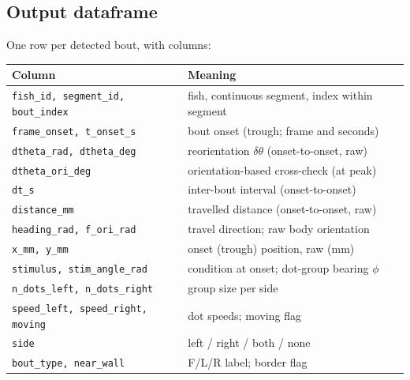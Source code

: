 \documentclass{article}
\begin{document}
\subsection{Output dataframe}
One row per detected bout, with columns:
\begin{table}[h]\centering\small
\begin{tabular}{@{}ll@{}}
\toprule
\textbf{Column} & \textbf{Meaning}\\
\midrule
\texttt{fish\_id, segment\_id, bout\_index} & fish, continuous segment, index within segment\\
\texttt{frame\_onset, t\_onset\_s}          & bout onset (trough; frame and seconds)\\
\texttt{dtheta\_rad, dtheta\_deg}           & reorientation $\delta\theta$ (onset-to-onset, raw)\\
\texttt{dtheta\_ori\_deg}                   & orientation-based cross-check (at peak)\\
\texttt{dt\_s}                              & inter-bout interval (onset-to-onset)\\
\texttt{distance\_mm}                       & travelled distance (onset-to-onset, raw)\\
\texttt{heading\_rad, f\_ori\_rad}          & travel direction; raw body orientation\\
\texttt{x\_mm, y\_mm}                       & onset (trough) position, raw (mm)\\
\texttt{stimulus, stim\_angle\_rad}         & condition at onset; dot-group bearing $\phi$\\
\texttt{n\_dots\_left, n\_dots\_right}      & group size per side\\
\texttt{speed\_left, speed\_right, moving}  & dot speeds; moving flag\\
\texttt{side}                               & left / right / both / none\\
\texttt{bout\_type, near\_wall}             & F/L/R label; border flag\\
\bottomrule
\end{tabular}
\end{table}
\end{document}

